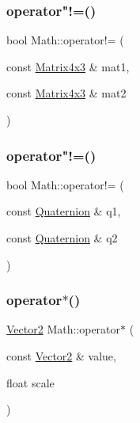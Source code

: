 \mbox{\label{namespace_math_a4834d702630aaf6717303b4faf834cd2}} 
\subsubsection{\texorpdfstring{operator"!=()}{operator!=()}\hspace{0.1cm}{\footnotesize\ttfamily [5/6]}}
{\footnotesize\ttfamily bool Math\+::operator!= (\begin{DoxyParamCaption}\item[{const \mbox{\hyperlink{struct_math_1_1_matrix4x3}{Matrix4x3}} \&}]{mat1,  }\item[{const \mbox{\hyperlink{struct_math_1_1_matrix4x3}{Matrix4x3}} \&}]{mat2 }\end{DoxyParamCaption})}

\mbox{\label{namespace_math_a2018345b202259554f37833e2ad4f368}} 
\subsubsection{\texorpdfstring{operator"!=()}{operator!=()}\hspace{0.1cm}{\footnotesize\ttfamily [6/6]}}
{\footnotesize\ttfamily bool Math\+::operator!= (\begin{DoxyParamCaption}\item[{const \mbox{\hyperlink{struct_math_1_1_quaternion}{Quaternion}} \&}]{q1,  }\item[{const \mbox{\hyperlink{struct_math_1_1_quaternion}{Quaternion}} \&}]{q2 }\end{DoxyParamCaption})}

\mbox{\label{namespace_math_a9071831f1488bc75d0dff29a52258009}} 
\subsubsection{\texorpdfstring{operator$\ast$()}{operator*()}\hspace{0.1cm}{\footnotesize\ttfamily [1/19]}}
{\footnotesize\ttfamily \mbox{\hyperlink{struct_math_1_1_vector2}{Vector2}} Math\+::operator$\ast$ (\begin{DoxyParamCaption}\item[{const \mbox{\hyperlink{struct_math_1_1_vector2}{Vector2}} \&}]{value,  }\item[{float}]{scale }\end{DoxyParamCaption})}

